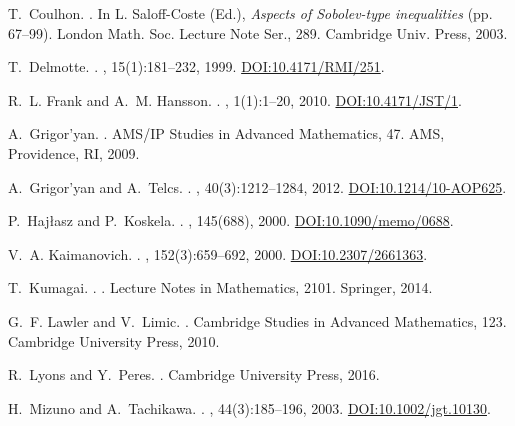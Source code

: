 \documentclass[11pt]{article}
\numberwithin{equation}{section}
\begin{document}
\begin{thebibliography}{99}
T.~Coulhon.
.
\newblock In L. Saloff-Coste (Ed.), {\em Aspects of Sobolev-type inequalities} (pp. 67--99). London Math. Soc. Lecture Note Ser., 289. Cambridge Univ. Press, 2003.

T.~Delmotte.
.
, 15(1):181--232, 1999.
\newblock \href{https://doi.org/10.4171/RMI/251}{DOI:10.4171/RMI/251}.

R.~L. Frank and A.~M. Hansson.
.
, 1(1):1--20, 2010.
\newblock \href{https://doi.org/10.4171/JST/1}{DOI:10.4171/JST/1}.

A.~Grigor'yan.
.
\newblock AMS/IP Studies in Advanced Mathematics, 47. AMS, Providence, RI, 2009.

A.~Grigor'yan and A.~Telcs.
.
, 40(3):1212--1284, 2012.
\newblock \href{https://doi.org/10.1214/10-AOP625}{DOI:10.1214/10-AOP625}.

P.~Hajłasz and P.~Koskela.
.
, 145(688), 2000.
\newblock \href{https://doi.org/10.1090/memo/0688}{DOI:10.1090/memo/0688}.

V.~A. Kaimanovich.
.
, 152(3):659--692, 2000.
\newblock \href{https://doi.org/10.2307/2661363}{DOI:10.2307/2661363}.

T.~Kumagai.
.
. Lecture Notes in Mathematics, 2101. Springer, 2014.

G.~F. Lawler and V.~Limic.
.
\newblock Cambridge Studies in Advanced Mathematics, 123. Cambridge University Press, 2010.

R.~Lyons and Y.~Peres.
.
\newblock Cambridge University Press, 2016.

H.~Mizuno and A.~Tachikawa.
.
, 44(3):185--196, 2003.
\newblock \href{https://doi.org/10.1002/jgt.10130}{DOI:10.1002/jgt.10130}.

\end{thebibliography}
\end{document}

